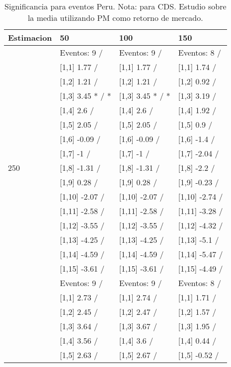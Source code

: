 \begin{table}

\caption{Significancia para eventos Peru. Nota: para CDS. Estudio sobre la media utilizando PM como retorno de mercado.}
\centering
\begin{tabular}[t]{llll}
\toprule
Estimacion & 50 & 100 & 150\\
\midrule
 & Eventos:  9 / & Eventos:  9 / & Eventos:  8 /\\
 & {}[1,1] 1.77  / & {}[1,1] 1.77  / & {}[1,1] 1.74  /\\
 & {}[1,2] 1.21  / & {}[1,2] 1.21  / & {}[1,2] 0.92  /\\
 & {}[1,3] 3.45 * / * & {}[1,3] 3.45 * / * & {}[1,3] 3.19  /\\
 & {}[1,4] 2.6  / & {}[1,4] 2.6  / & {}[1,4] 1.92  /\\
\addlinespace
 & {}[1,5] 2.05  / & {}[1,5] 2.05  / & {}[1,5] 0.9  /\\
 & {}[1,6] -0.09  / & {}[1,6] -0.09  / & {}[1,6] -1.4  /\\
 & {}[1,7] -1  / & {}[1,7] -1  / & {}[1,7] -2.04  /\\
250 & {}[1,8] -1.31  / & {}[1,8] -1.31  / & {}[1,8] -2.2  /\\
 & {}[1,9] 0.28  / & {}[1,9] 0.28  / & {}[1,9] -0.23  /\\
\addlinespace
 & {}[1,10] -2.07  / & {}[1,10] -2.07  / & {}[1,10] -2.74  /\\
 & {}[1,11] -2.58  / & {}[1,11] -2.58  / & {}[1,11] -3.28  /\\
 & {}[1,12] -3.55  / & {}[1,12] -3.55  / & {}[1,12] -4.32  /\\
 & {}[1,13] -4.25  / & {}[1,13] -4.25  / & {}[1,13] -5.1  /\\
 & {}[1,14] -4.59  / & {}[1,14] -4.59  / & {}[1,14] -5.47  /\\
\addlinespace
 & {}[1,15] -3.61  / & {}[1,15] -3.61  / & {}[1,15] -4.49  /\\
 & Eventos:  9 / & Eventos:  9 / & Eventos:  8 /\\
 & {}[1,1] 2.73  / & {}[1,1] 2.74  / & {}[1,1] 1.71  /\\
 & {}[1,2] 2.45  / & {}[1,2] 2.47  / & {}[1,2] 1.57  /\\
 & {}[1,3] 3.64  / & {}[1,3] 3.67  / & {}[1,3] 1.95  /\\
\addlinespace
 & {}[1,4] 3.56  / & {}[1,4] 3.6  / & {}[1,4] 0.44  /\\
 & {}[1,5] 2.63  / & {}[1,5] 2.67  / & {}[1,5] -0.52  /\\

\end{tabular}
\end{table}
